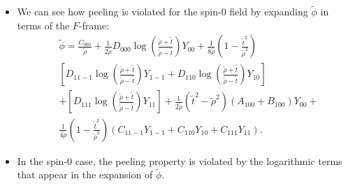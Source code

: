 \documentclass{beamer}
\theoremstyle{remark}
\theoremstyle{plain}
\theoremstyle{plain}
\begin{document}
\begin{frame}
  \begin{itemize}
    \item We can see how peeling is violated for the spin-0 field by expanding $\tilde{\phi}$ in terms of the $F$-frame:
    \begin{align}\label{eq:phi_tilde}
      & \tilde{\phi}=\frac{C_{000}}{\tilde{\rho}}+\frac{1}{2 \tilde{\rho}} D_{000} \log \left(\frac{\tilde{\rho}+\tilde{t}}{\tilde{\rho}-\tilde{t}}\right) Y_{00} + \frac{1}{8{\tilde{\rho}}}\left(1-\frac{\tilde{t}^{2}}{\tilde{\rho}^{2}}\right) \nonumber \\
      & \left[D_{11-1}\log \left(\frac{\tilde{\rho}+\tilde{t}}{\tilde{\rho}-\tilde{t}}\right) Y_{1-1}+D_{110} \log\left(\frac{\tilde{\rho}+\tilde{t}}{\tilde{\rho}-\tilde{t}}\right) Y_{10}\right] \nonumber \\     
      &+\left[D_{111} \log\left(\frac{\tilde{\rho}+\tilde{t}}{\tilde{\rho}-\tilde{t}}\right)Y_{11}\right]+ \frac{1}{2 \tilde{\rho}}\left(\tilde{t}^{2}-\tilde{\rho}^{2}\right)\left(A_{100}+B_{100}\right) Y_{00}+ \nonumber \\
      &\frac{1}{4 \tilde{\rho}}\left(1-\frac{\tilde{t}^{2}}{\tilde{\rho}^{2}}\right)\left(C_{11-1} Y_{1-1}+C_{110} Y_{10}+C_{111} Y_{11}\right).
    \end{align}
    \item In the spin-0 case, the peeling property is violated by the logarithmic terms that appear in the expansion of $\tilde{\phi}$.
  \end{itemize}
\end{frame}
\end{document}
